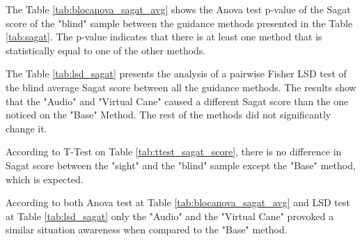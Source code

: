 The Table \ref{tab:blocanova_sagat_avg} shows the Anova test p-value of the Sagat score of the "blind" sample between the guidance methods presented in the Table \ref{tab:sagat}. The p-value indicates that there is at least one method that is statistically equal to one of the other methods.



The Table \ref{tab:lsd_sagat} presents the analysis of a pairwise Fisher LSD test of the blind average Sagat score between all the guidance methods. The results show that the "Audio" and "Virtual Cane" caused a different Sagat score than the one noticed on the "Base" Method. The rest of the methods did not significantly change it.



According to T-Test on Table \ref{tab:ttest_sagat_score}, there is no difference in Sagat score between the "sight" and the "blind" sample except the "Base" method, which is expected.

According to both Anova test at Table \ref{tab:blocanova_sagat_avg} and LSD test at Table \ref{tab:lsd_sagat} only the "Audio"  and the "Virtual Cane" provoked a similar situation awareness when compared to the "Base" method.

\FloatBarrier